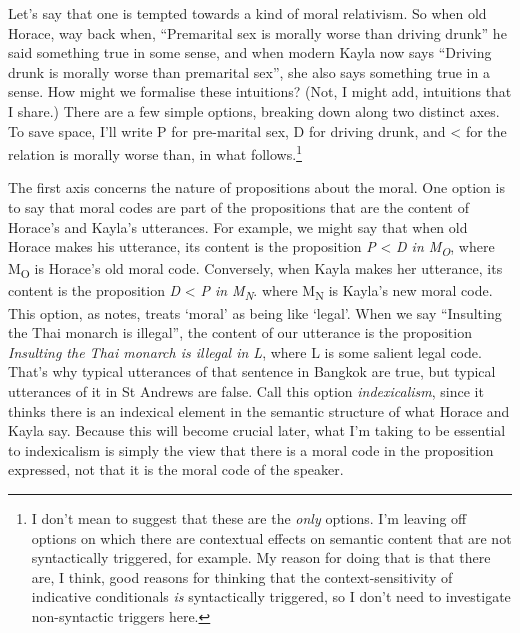 Let's say that one is tempted towards a kind of moral relativism. So when old Horace, way back when, ``Premarital sex is morally worse than driving drunk'' he said something true in some sense, and when modern Kayla now says ``Driving drunk is morally worse than premarital sex'', she also says something true in a sense. How might we formalise these intuitions? (Not, I might add, intuitions that I share.) There are a few simple options, breaking down along two distinct axes. To save space, I'll write P for pre-marital sex, D for driving drunk, and {\textless} for the relation is morally worse than, in what follows.\footnote{ I don't mean to suggest that these are the \textit{only} options. I'm leaving off options on which there are contextual effects on semantic content that are not syntactically triggered, for example. My reason for doing that is that there are, I think, good reasons for thinking that the context-sensitivity of indicative conditionals \textit{is} syntactically triggered, so I don't need to investigate non-syntactic triggers here.}

The first axis concerns the nature of propositions about the moral. One option is to say that moral codes are part of the propositions that are the content of Horace's and Kayla's utterances. For example, we might say that when old Horace makes his utterance, its content is the proposition \textit{P }{\textless}\textit{ D in M}\textit{\textsubscript{O}}, where M\textsubscript{O} is Horace's old moral code. Conversely, when Kayla makes her utterance, its content is the proposition \textit{D }{\textless}\textit{ P in M}\textit{\textsubscript{N}}. where M\textsubscript{N} is Kayla's new moral code. This option, as \citet{SayreMcCord1991} notes, treats `moral' as being like `legal'. When we say ``Insulting the Thai monarch is illegal'', the content of our utterance is the proposition \textit{Insulting the Thai monarch is illegal in L}, where L is some salient legal code. That's why typical utterances of that sentence in Bangkok are true, but typical utterances of it in St Andrews are false. Call this option \textit{indexicalism}, since it thinks there is an indexical element in the semantic structure of what Horace and Kayla say. Because this will become crucial later, what I'm taking to be essential to indexicalism is simply the view that there is a moral code in the proposition expressed, not that it is the moral code of the speaker.

